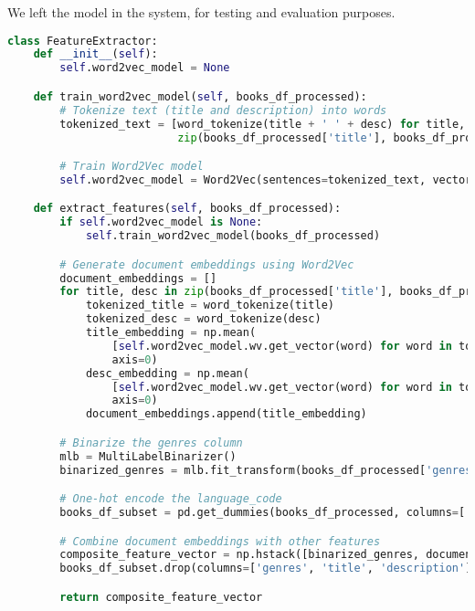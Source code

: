 We left the model in the system, for testing and evaluation purposes.

\begin{lstlisting}[language=Python, caption={Feature Extraction using traditional Word2Vec}, label={lst:example}, linewidth=\linewidth, breaklines=true]
    class FeatureExtractor:
    def __init__(self):
        self.word2vec_model = None

    def train_word2vec_model(self, books_df_processed):
        # Tokenize text (title and description) into words
        tokenized_text = [word_tokenize(title + ' ' + desc) for title, desc in
                          zip(books_df_processed['title'], books_df_processed['description'])]

        # Train Word2Vec model
        self.word2vec_model = Word2Vec(sentences=tokenized_text, vector_size=100, window=5, min_count=1, workers=4)

    def extract_features(self, books_df_processed):
        if self.word2vec_model is None:
            self.train_word2vec_model(books_df_processed)

        # Generate document embeddings using Word2Vec
        document_embeddings = []
        for title, desc in zip(books_df_processed['title'], books_df_processed['description']):
            tokenized_title = word_tokenize(title)
            tokenized_desc = word_tokenize(desc)
            title_embedding = np.mean(
                [self.word2vec_model.wv.get_vector(word) for word in tokenized_title if word in self.word2vec_model.wv],
                axis=0)
            desc_embedding = np.mean(
                [self.word2vec_model.wv.get_vector(word) for word in tokenized_desc if word in self.word2vec_model.wv],
                axis=0)
            document_embeddings.append(title_embedding)

        # Binarize the genres column
        mlb = MultiLabelBinarizer()
        binarized_genres = mlb.fit_transform(books_df_processed['genres'])

        # One-hot encode the language_code
        books_df_subset = pd.get_dummies(books_df_processed, columns=['language_code'])

        # Combine document embeddings with other features
        composite_feature_vector = np.hstack([binarized_genres, document_embeddings,
        books_df_subset.drop(columns=['genres', 'title', 'description']).values])

        return composite_feature_vector
\end{lstlisting}

